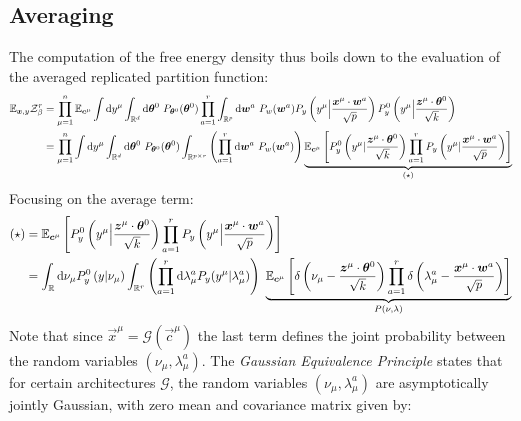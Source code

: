 \documentclass[11pt]{article}
\numberwithin{equation}{section}
\begin{document}
\subsection*{Averaging}
The computation of the free energy density thus boils down to the evaluation of the averaged replicated partition function:
\begin{align}
\mathbb{E}_{\bm{x},y}\mathcal{Z}^{r}_{\beta} &= \prod\limits_{\mu=1}^{n}\mathbb{E}_{\bm{c}^{\mu}}\int\text{d} y^{\mu}\int_{\mathbb{R}^{d}}\text{d}\bm{\theta}^{0}~P_{\bm{\theta}^{0}}(\bm{\theta}^{0})	\prod\limits_{a=1}^{r}\int_{\mathbb{R}^{p}}\text{d}\bm{w}^{a}~P_{w}(\bm{w}^{a})P_{y}\left(y^{\mu}\Big|\frac{\bm{x}^{\mu}\cdot \bm{w}^{a}}{\sqrt{p}}\right)P^{0}_{y}\left(y^{\mu}\Big|\frac{\bm{z}^{\mu}\cdot\bm{\theta}^{0}}{\sqrt{k}}\right)\notag\\
&=\prod\limits_{\mu=1}^{n}\int\text{d} y^{\mu}\int_{\mathbb{R}^{d}}\text{d}\bm{\theta}^{0}~P_{\bm{\theta}^{0}}(\bm{\theta}^{0})	\int_{\mathbb{R}^{p\times r}}\left(\prod\limits_{a=1}^{r}\text{d}\bm{w}^{a}~P_{w}(\bm{w}^{a})\right)\underbrace{\mathbb{E}_{\bm{c}^{\mu}}\left[P^{0}_{y}\left(y^{\mu}|\frac{\bm{z}^{\mu}\cdot\bm{\theta}^{0}}{\sqrt{k}}\right)\prod\limits_{a=1}^{r}P_{y}\left(y^{\mu}|\frac{\bm{x}^{\mu}\cdot\bm{w}^{a}}{\sqrt{p}}\right)\right]}_{(\star)}
\end{align}
Focusing on the average term:
\begin{align}
	(\star) &= \mathbb{E}_{\bm{c}^{\mu}}\left[P^{0}_{y}\left(y^{\mu}\Big|\frac{\bm{z}^{\mu}\cdot\bm{\theta}^{0}}{\sqrt{k}}\right)\prod\limits_{a=1}^{r}P_{y}\left(y^{\mu}\Big|\frac{\bm{x}^{\mu}\cdot\bm{w}^{a}}{\sqrt{p}}\right)\right]\notag\\ 
	&= \int_{\mathbb{R}}\text{d}\nu_{\mu}P_{y}^{0}\left(y|\nu_{\mu}\right)\int_{\mathbb{R}^{r}}\left(\prod\limits_{a=1}^{r}\text{d}\lambda^{a}_{\mu}P_{y}(y^{\mu}|\lambda_{\mu}^{a})\right)~\underbrace{\mathbb{E}_{\bm{c}^{\mu}}\left[\delta\left(\nu_{\mu}-\frac{\bm{z}^{\mu}\cdot\bm{\theta}^{0}}{\sqrt{k}}\right)\prod\limits_{a=1}^{r}\delta\left(\lambda^{a}_{\mu}-\frac{\bm{x}^{\mu}\cdot\bm{w}^{a}}{\sqrt{p}}\right)\right]}_{P(\nu,\lambda)}
\end{align}
Note that since $\vec{x}^{\mu}=\mathcal{G}(\vec{c}^{\mu})$ the last term defines the joint probability between the random variables $(\nu_{\mu},\lambda^{a}_{\mu})$. The \emph{Gaussian Equivalence Principle} states that for certain architectures $\mathcal{G}$, the random variables $(\nu_{\mu},\lambda^{a}_{\mu})$ are asymptotically jointly Gaussian, with zero mean and covariance matrix given by:
\end{document}

